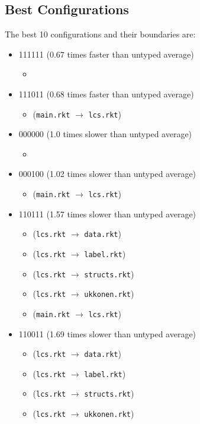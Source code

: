\documentclass{article}
\newcommand{\mono}[1]{\texttt{#1}}
\begin{document}
\subsection{Best Configurations}
The best 10 configurations and their boundaries are:
\begin{itemize}
\item 111111 (0.67 times faster than untyped average)
  \begin{itemize}
  \item 
  \end{itemize}
\item 111011 (0.68 times faster than untyped average)
  \begin{itemize}
  \item (\mono{main.rkt} $\rightarrow$ \mono{lcs.rkt})
  \end{itemize}
\item 000000 (1.0 times slower than untyped average)
  \begin{itemize}
  \item 
  \end{itemize}
\item 000100 (1.02 times slower than untyped average)
  \begin{itemize}
  \item (\mono{main.rkt} $\rightarrow$ \mono{lcs.rkt})
  \end{itemize}
\item 110111 (1.57 times slower than untyped average)
  \begin{itemize}
  \item (\mono{lcs.rkt} $\rightarrow$ \mono{data.rkt})
  \item (\mono{lcs.rkt} $\rightarrow$ \mono{label.rkt})
  \item (\mono{lcs.rkt} $\rightarrow$ \mono{structs.rkt})
  \item (\mono{lcs.rkt} $\rightarrow$ \mono{ukkonen.rkt})
  \item (\mono{main.rkt} $\rightarrow$ \mono{lcs.rkt})
  \end{itemize}
\item 110011 (1.69 times slower than untyped average)
  \begin{itemize}
  \item (\mono{lcs.rkt} $\rightarrow$ \mono{data.rkt})
  \item (\mono{lcs.rkt} $\rightarrow$ \mono{label.rkt})
  \item (\mono{lcs.rkt} $\rightarrow$ \mono{structs.rkt})
  \item (\mono{lcs.rkt} $\rightarrow$ \mono{ukkonen.rkt})

\end{itemize}
\end{itemize}
\end{document}
